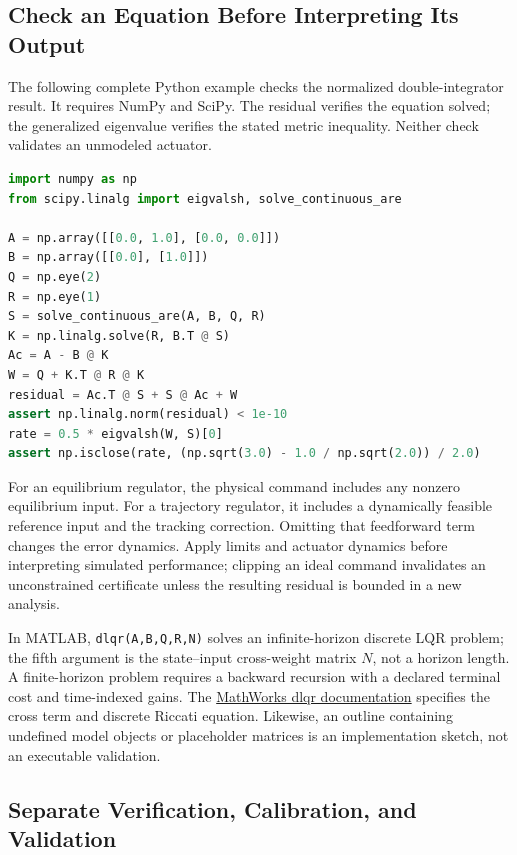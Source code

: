 \subsection{Check an Equation Before Interpreting Its Output}

The following complete Python example checks the normalized double-integrator result. It requires NumPy and SciPy. The residual verifies the equation solved; the generalized eigenvalue verifies the stated metric inequality. Neither check validates an unmodeled actuator.

\begin{lstlisting}[language=Python]
import numpy as np
from scipy.linalg import eigvalsh, solve_continuous_are

A = np.array([[0.0, 1.0], [0.0, 0.0]])
B = np.array([[0.0], [1.0]])
Q = np.eye(2)
R = np.eye(1)
S = solve_continuous_are(A, B, Q, R)
K = np.linalg.solve(R, B.T @ S)
Ac = A - B @ K
W = Q + K.T @ R @ K
residual = Ac.T @ S + S @ Ac + W
assert np.linalg.norm(residual) < 1e-10
rate = 0.5 * eigvalsh(W, S)[0]
assert np.isclose(rate, (np.sqrt(3.0) - 1.0 / np.sqrt(2.0)) / 2.0)
\end{lstlisting}

For an equilibrium regulator, the physical command includes any nonzero equilibrium input. For a trajectory regulator, it includes a dynamically feasible reference input and the tracking correction. Omitting that feedforward term changes the error dynamics. Apply limits and actuator dynamics before interpreting simulated performance; clipping an ideal command invalidates an unconstrained certificate unless the resulting residual is bounded in a new analysis.

In MATLAB, \texttt{dlqr(A,B,Q,R,N)} solves an infinite-horizon discrete LQR problem; the fifth argument is the state--input cross-weight matrix $N$, not a horizon length. A finite-horizon problem requires a backward recursion with a declared terminal cost and time-indexed gains. The \href{https://www.mathworks.com/help/control/ref/lti.dlqr.html}{MathWorks dlqr documentation} specifies the cross term and discrete Riccati equation. Likewise, an outline containing undefined model objects or placeholder matrices is an implementation sketch, not an executable validation.

\subsection{Separate Verification, Calibration, and Validation}

